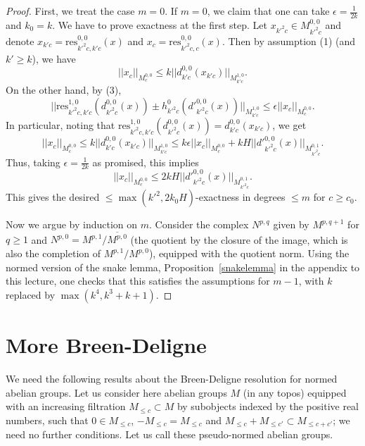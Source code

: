 \begin{proof}
  First, we treat the case $m=0$.
  If $m=0$, we claim that one can take $\epsilon=\tfrac 1{2k}$ and $k_0=k$.
  We have to prove exactness at the first step.
  Let $x_{k'^2c}\in M^{0,0}_{k'^2c}$ and
  denote $x_{k'c}=\mathrm{res}_{k'^2c,k'c}^{0,0}(x)$
  and $x_c=\mathrm{res}_{k'^2c,c}^{0,0}(x)$.
  Then by assumption (1) (and $k'\geq k$), we have
  \[
  ||x_c||_{M^{0,0}_c}\leq k||d^{0,0}_{k'c}(x_{k'c})||_{M^{1,0}_{k'c}}.
  \]
  On the other hand, by (3),
  \[
  ||\mathrm{res}_{k'^2c,k'c}^{1,0}(d^{0,0}_{k'^2c}(x))\pm h^0_{k'^2c}(d'^{0,0}_{k'^2c}(x))||_{M^{1,0}_{k'c}}\leq \epsilon ||x_c||_{M^{0,0}_c}.
  \]
  In particular, noting that $\mathrm{res}_{k'^2c,k'c}^{1,0}(d^{0,0}_{k'^2c}(x)) = d^{0,0}_{k'c}(x_{k'c})$, we get
  \[
  ||x_c||_{M^{0,0}_c}\leq k||d^{0,0}_{k'c}(x_{k'c})||_{M^{1,0}_{k'c}}\leq k\epsilon ||x_c||_{M^{0,0}_c} + kH ||d'^{0,0}_{k'^2c}(x)||_{M^{0,1}_{k'^2c}}.
  \]
  Thus, taking $\epsilon=\tfrac 1{2k}$ as promised, this implies
  \[
  ||x_c||_{M^{0,0}_c}\leq 2kH ||d'^{0,0}_{k'^2c}(x)||_{M^{0,1}_{k'^2c}}.
  \]
  This gives the desired $\leq \max(k'^2,2k_0H)$-exactness in degrees $\leq m$ for $c\geq c_0$.

  Now we argue by induction on $m$.
  Consider the complex $N^{p,q}$ given by $M^{p,q+1}$ for $q\geq 1$
  and $N^{p,0} = M^{p,1}/\overline{M^{p,0}}$
  (the quotient by the closure of the image, which is also the completion of $M^{p,1}/M^{p,0}$),
  equipped with the quotient norm.
  Using the normed version of the snake lemma,
  Proposition~\ref{snakelemma} in the appendix to this lecture,
  one checks that this satisfies the assumptions for $m-1$,
  with $k$ replaced by $\max(k^4,k^3+k+1)$.
\end{proof}

\section{More Breen-Deligne}%
\label{sec:more_breen_deligne}


We need the following results about the Breen-Deligne resolution for normed abelian groups. Let us consider here abelian groups $M$ (in any topos) equipped with an increasing filtration $M_{\leq c}\subset M$ by subobjects indexed by the positive real numbers, such that $0\in M_{\leq c}$, $-M_{\leq c} = M_{\leq c}$ and $M_{\leq c}+M_{\leq c'}\subset M_{\leq c+c'}$; we need no further conditions. Let us call these pseudo-normed abelian groups.

